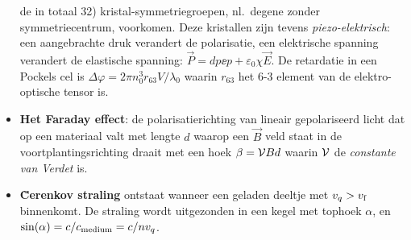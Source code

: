 \documentclass[twoside]{report}
\begin{document}
\begin{itemize}
      de in totaal 32) kristal-symmetriegroepen, nl.\ degene zonder
      symmetriecentrum, voorkomen. Deze kristallen zijn tevens
      {\it piezo-elektrisch}: een aangebrachte druk verandert de polarisatie,
      een elektrische spanning verandert de elastische spanning:
      $\vec{P}=dp\ee{p}+\varepsilon_0\chi\vec{E}$. De retardatie in een
      Pockels cel is $\Delta\varphi=2\pi n_0^3 r_{63}V/\lambda_0$ waarin
      $r_{63}$ het 6-3 element van de elektro-optische tensor is.
\item {\bf Het Faraday effect}: de polarisatierichting van lineair
      gepolariseerd licht dat op een materiaal valt met lengte $d$ waarop een
      $\vec{B}$ veld staat in de voortplantingsrichting draait met een hoek
      $\beta={\cal V}Bd$ waarin $\cal V$ de {\it constante van Verdet} is.
\item {\bf \u{C}erenkov straling} ontstaat wanneer een geladen deeltje met
      $v_q>v_{\rm f}$ binnenkomt. De straling wordt uitgezonden in een kegel
      met tophoek $\alpha$, en $\sin(\alpha)=c/c_{\rm medium}=c/nv_q$.
\end{itemize}
\end{document}

